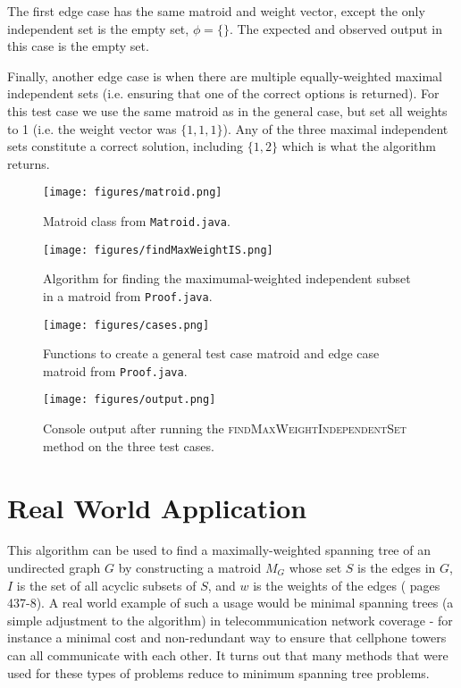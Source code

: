 \documentclass[12pt]{article}
\begin{document}
The first edge case has the same matroid and weight vector, except the only independent set is the empty set, $\phi = \{\}$. The expected and observed output in this case is the empty set. 

Finally, another edge case is when there are multiple equally-weighted maximal independent sets (i.e. ensuring that one of the correct options is returned). For this test case we use the same matroid as in the general case, but set all weights to 1 (i.e. the weight vector was $\{1,1,1\}$). Any of the three maximal independent sets constitute a correct solution, including $\{1,2\}$ which is what the algorithm returns. 

\clearpage
\begin{figure}[h]
    \centering
    \texttt{[image: figures/matroid.png]}
    \caption{Matroid class from \texttt{Matroid.java}.}
\end{figure}

\begin{figure}[h]
    \centering
    \texttt{[image: figures/findMaxWeightIS.png]}
    \caption{Algorithm for finding the maximumal-weighted independent subset in a matroid from \texttt{Proof.java}.}
\end{figure}

\begin{figure}[h]
    \centering
    \texttt{[image: figures/cases.png]}
    \caption{Functions to create a general test case matroid and edge case matroid from \texttt{Proof.java}.}
\end{figure}

\begin{figure}[h]
    \centering
    \texttt{[image: figures/output.png]}
    \caption{Console output after running the \textsc{findMaxWeightIndependentSet} method on the three test cases.}
\end{figure}


\clearpage
\section*{Real World Application}
This algorithm can be used to find a maximally-weighted spanning tree of an undirected graph $G$ by constructing a matroid $M_{G}$ whose set $S$ is the edges in $G$, $I$ is the set of all acyclic subsets of $S$, and $w$ is the weights of the edges (\cite{cormen2009introduction} pages 437-8). A real world example of such a usage would be minimal spanning trees (a simple adjustment to the algorithm) in telecommunication network coverage \cite{MST} - for instance a minimal cost and non-redundant way to ensure that cellphone towers can all communicate with each other. It turns out that many methods that were used for these types of problems reduce to minimum spanning tree problems.


\clearpage


\end{document}
